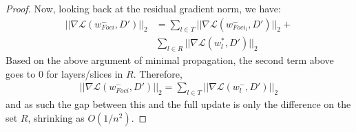 \begin{proof}
Now, looking back at the residual gradient norm, we have:
\begin{align}
    \label{eq:foci_res_norm_simplified}
    ||\nabla \mathcal{L}(w^-_{Foci},D')||_2 &= \sum_{l \in T} ||\nabla \mathcal{L}(w^-_{Foci_l}, D') ||_2 + \\
    & \sum_{l \in R} ||\nabla \mathcal{L}(w^*_{l}, D') ||_2
\end{align}
Based on the above argument of minimal propagation, the second term above goes to $0$ for layers/slices in $R$.
Therefore,
\begin{align}
    \label{eq:foci_res}
    ||\nabla \mathcal{L}(w^-_{Foci},D')||_2 = \sum_{l \in T} ||\nabla \mathcal{L}(w^-_{l}, D') ||_2 
\end{align}
and as such the gap between this and the full update is only the difference on the set $R$, shrinking as $O(1/n^2)$.
\end{proof}

